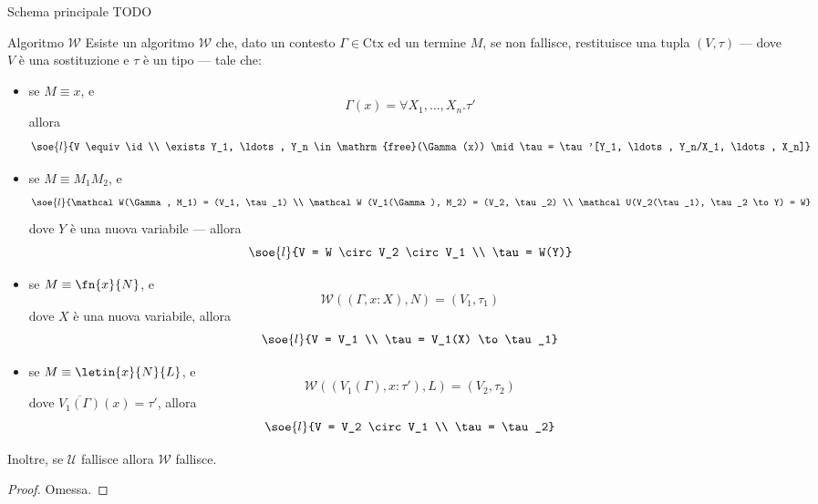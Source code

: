 \documentclass[a4paper, 12pt]{report}
\begin{document}
    \begin{frameddefn}{Schema principale}
        TODO
    \end{frameddefn}

    \begin{framedthm}[breakable]{Algoritmo $\mathcal W$}
        Esiste un algoritmo $\mathcal W$  che, dato un contesto $\Gamma \in \mathrm{Ctx}$ ed un termine $M$, se non fallisce, restituisce una tupla $(V, \tau)$ --- dove $V$ è una sostituzione e $\tau$ è un tipo --- tale che:

        \begin{itemize}
            \item se $M \equiv x$, e $$\Gamma(x) = \forall X_1, \ldots, X_n.\tau'$$ allora $$\soe{l}{V \equiv \id \\ \exists Y_1, \ldots, Y_n \in \mathrm{free}(\Gamma(x)) \mid \tau = \tau'[Y_1, \ldots, Y_n/X_1, \ldots, X_n]}$$
            \item se $M \equiv M_1 M_2$, e $$\soe{l}{\mathcal W(\Gamma, M_1) = (V_1, \tau_1) \\ \mathcal W (V_1(\Gamma), M_2) = (V_2, \tau_2) \\ \mathcal U(V_2(\tau_1), \tau_2 \to Y) = W}$$ dove $Y$ è una nuova variabile --- allora $$\soe{l}{V = W \circ V_2 \circ V_1 \\ \tau = W(Y)}$$ 
            \item se $M \equiv \fn{x}{N}$, e $$\mathcal W((\Gamma, x:X), N) = (V_1, \tau_1)$$ dove $X$ è una nuova variabile, allora $$\soe{l}{V = V_1 \\ \tau = V_1(X) \to \tau_1}$$
            \item se $M \equiv \letin{x}{N}{L}$, e $$\mathcal W((V_1(\Gamma), x: \tau'), L) = (V_2, \tau_2)$$ dove $\overline{V_1(\Gamma)}(x) = \tau'$, allora $$\soe{l}{V = V_2 \circ V_1 \\ \tau = \tau_2}$$
        \end{itemize}
        
        Inoltre, se $\mathcal U$ fallisce allora $\mathcal W$ fallisce.
    \end{framedthm}

    \begin{proof}
        Omessa.
    \end{proof}
\end{document}
